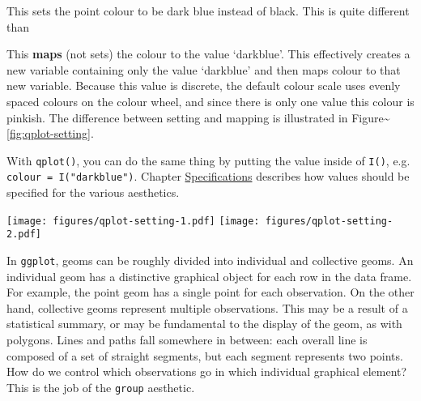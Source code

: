 \noindent This sets the point colour to be dark blue instead of black.
This is quite different than

\begin{Shaded}
\begin{Highlighting}[]
\StringTok{ }\NormalTok{(}\NormalTok{(} \NormalTok{))}
\end{Highlighting}
\end{Shaded}

\noindent This \textbf{maps} (not sets) the colour to the value
`darkblue'. This effectively creates a new variable containing only the
value `darkblue' and then maps colour to that new variable. Because this
value is discrete, the default colour scale uses evenly spaced colours
on the colour wheel, and since there is only one value this colour is
pinkish. The difference between setting and mapping is illustrated in
Figure\textasciitilde{}\ref{fig:qplot-setting}.

With \texttt{qplot()}, you can do the same thing by putting the value
inside of \texttt{I()}, e.g. \texttt{colour = I("darkblue")}. Chapter
\hyperref[cha:specifications]{Specifications} describes how values
should be specified for the various aesthetics. 

\begin{Shaded}
\begin{Highlighting}[]
 \NormalTok{(}\NormalTok{))}
 \NormalTok{)}
\end{Highlighting}
\end{Shaded}

\texttt{[image: figures/qplot-setting-1.pdf]}
\texttt{[image: figures/qplot-setting-2.pdf]}


In \texttt{ggplot}, geoms can be roughly divided into individual and
collective geoms. An individual geom has a distinctive graphical object
for each row in the data frame. For example, the point geom has a single
point for each observation. On the other hand, collective geoms
represent multiple observations. This may be a result of a statistical
summary, or may be fundamental to the display of the geom, as with
polygons. Lines and paths fall somewhere in between: each overall line
is composed of a set of straight segments, but each segment represents
two points. How do we control which observations go in which individual
graphical element? This is the job of the \texttt{group} aesthetic.

